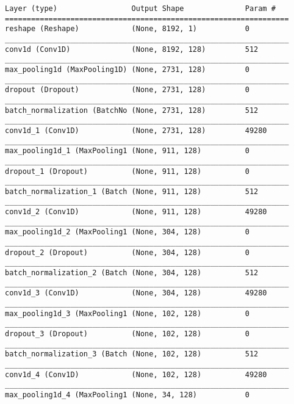 \footnotesize{
\begin{verbatim}
Layer (type)                 Output Shape              Param #   
=================================================================
reshape (Reshape)            (None, 8192, 1)           0         
_________________________________________________________________
conv1d (Conv1D)              (None, 8192, 128)         512       
_________________________________________________________________
max_pooling1d (MaxPooling1D) (None, 2731, 128)         0         
_________________________________________________________________
dropout (Dropout)            (None, 2731, 128)         0         
_________________________________________________________________
batch_normalization (BatchNo (None, 2731, 128)         512       
_________________________________________________________________
conv1d_1 (Conv1D)            (None, 2731, 128)         49280     
_________________________________________________________________
max_pooling1d_1 (MaxPooling1 (None, 911, 128)          0         
_________________________________________________________________
dropout_1 (Dropout)          (None, 911, 128)          0         
_________________________________________________________________
batch_normalization_1 (Batch (None, 911, 128)          512       
_________________________________________________________________
conv1d_2 (Conv1D)            (None, 911, 128)          49280     
_________________________________________________________________
max_pooling1d_2 (MaxPooling1 (None, 304, 128)          0         
_________________________________________________________________
dropout_2 (Dropout)          (None, 304, 128)          0         
_________________________________________________________________
batch_normalization_2 (Batch (None, 304, 128)          512       
_________________________________________________________________
conv1d_3 (Conv1D)            (None, 304, 128)          49280     
_________________________________________________________________
max_pooling1d_3 (MaxPooling1 (None, 102, 128)          0         
_________________________________________________________________
dropout_3 (Dropout)          (None, 102, 128)          0         
_________________________________________________________________
batch_normalization_3 (Batch (None, 102, 128)          512       
_________________________________________________________________
conv1d_4 (Conv1D)            (None, 102, 128)          49280     
_________________________________________________________________
max_pooling1d_4 (MaxPooling1 (None, 34, 128)           0         

\end{verbatim}}
